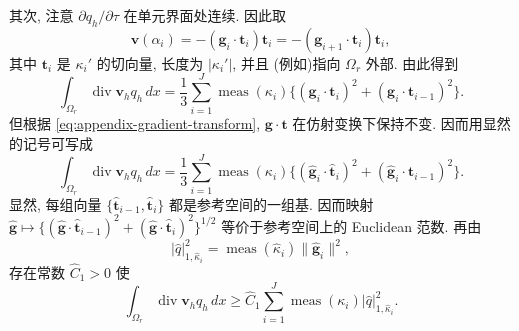 \begin{Proof}
其次, 注意 $\partial q_h/\partial\tau$ 在单元界面处连续. 因此取
\[
\mathbf v(\alpha_i)=-(\mathbf g_i\cdot\mathbf t_i)\mathbf t_i
=-(\mathbf g_{i+1}\cdot\mathbf t_i)\mathbf t_i,
\]
其中 $\mathbf t_i$ 是 $\kappa_i'$ 的切向量, 长度为 $|\kappa_i'|$, 并且
(例如)指向 $\Omega_r$ 外部. 由此得到
\[
\int_{\Omega_r}\operatorname{div}\mathbf v_hq_h\,dx
=\frac13\sum_{i=1}^J\operatorname{meas}(\kappa_i)
\{(\mathbf g_i\cdot\mathbf t_i)^2+(\mathbf g_i\cdot\mathbf t_{i-1})^2\}.
\]
但根据 \eqref{eq:appendix-gradient-transform}, $\mathbf g\cdot\mathbf t$
在仿射变换下保持不变. 因而用显然的记号可写成
\[
\int_{\Omega_r}\operatorname{div}\mathbf v_hq_h\,dx
=\frac13\sum_{i=1}^J\operatorname{meas}(\kappa_i)
\{(\widehat{\mathbf g}_i\cdot\widehat{\mathbf t}_i)^2
+(\widehat{\mathbf g}_i\cdot\widehat{\mathbf t}_{i-1})^2\}.
\]
显然, 每组向量 $\{\widehat{\mathbf t}_{i-1},\widehat{\mathbf t}_i\}$
都是参考空间的一组基. 因而映射
$\widehat{\mathbf g}\mapsto
\{(\widehat{\mathbf g}\cdot\widehat{\mathbf t}_{i-1})^2
+(\widehat{\mathbf g}\cdot\widehat{\mathbf t}_i)^2\}^{1/2}$
等价于参考空间上的 Euclidean 范数. 再由
\[
|\widehat q|_{1,\widehat\kappa_i}^2
=\operatorname{meas}(\widehat\kappa_i)
\|\widehat{\mathbf g}_i\|^2,
\]
存在常数 $\widehat C_1>0$ 使
\begin{equation}\label{eq:primitive-hood-taylor-local-positive-form}
\int_{\Omega_r}\operatorname{div}\mathbf v_hq_h\,dx
\geq\widehat C_1\sum_{i=1}^J
\operatorname{meas}(\kappa_i)|\widehat q|_{1,\widehat\kappa_i}^2.
\end{equation}


\end{Proof}
